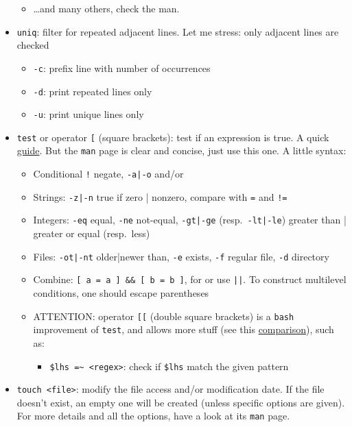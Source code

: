 \documentclass[a4paper,12pt,%
              final%
              ]{article}
\begin{document}
\begin{itemize}
\begin{itemize}
      \item \ldots and many others, check the man.
    \end{itemize}
  \item \texttt{uniq}: filter for repeated adjacent lines. Let me stress: only adjacent lines are checked
    \begin{itemize}
      \item \verb|-c|: prefix line with number of occurrences
      \item \verb|-d|: print repeated lines only
      \item \verb|-u|: print unique lines only
    \end{itemize}
  \item \texttt{test} or operator \verb|[| (square brackets): test if an expression is true. A quick \href{https://www.computerhope.com/unix/test.htm}{guide}. But the \texttt{man} page is clear and concise, just use this one. A little syntax:
    \begin{itemize}
      \item Conditional \verb|!| negate, \verb!-a|-o! and/or
      \item Strings: \verb!-z|-n! true if zero | nonzero, compare with \verb|=| and \verb|!=|
      \item Integers: \verb|-eq| equal, \verb|-ne| not-equal, \verb!-gt|-ge! (resp.\ \verb!-lt|-le!) greater than | greater or equal (resp.\ less)
      \item Files: \verb!-ot|-nt! older|newer than, \verb|-e| exists, \verb|-f| regular file, \verb|-d| directory
      \item Combine: \verb|[ a = a ] && [ b = b ]|, for or use \verb!||!. To construct multilevel conditions, one should escape parentheses
      \item ATTENTION: operator \verb|[[| (double square brackets) is a \texttt{bash} improvement of \texttt{test}, and allows more stuff (see this \href{https://stackoverflow.com/a/47576482}{comparison}), such as:
        \begin{itemize}
          \item \verb|$lhs =~ <regex>|: check if \verb|$lhs| match the given pattern
        \end{itemize}
    \end{itemize}
  \item \verb|touch <file>|: modify the file access and/or modification date. If the file doesn't exist, an empty one will be created (unless specific options are given). For more details and all the options, have a look at its \texttt{man} page.\\

\end{itemize}
\end{document}
